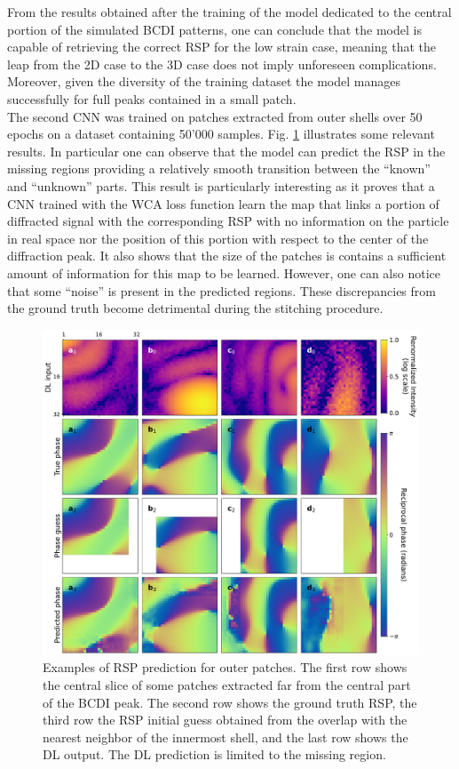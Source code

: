 From the results obtained after the training of the model dedicated to the central portion of the simulated BCDI patterns, 
one can conclude that the model is capable of retrieving the correct RSP for the low strain case, meaning that the leap from 
the 2D case to the 3D case does not imply unforeseen complications. Moreover, given the diversity of the training dataset 
the model manages successfully for full peaks contained in a small patch. \\

The second CNN was trained on patches extracted from outer shells over 50 epochs on a dataset containing 50'000 samples. 
Fig. \ref{fig:outerpatch_obj_lowstrain} illustrates some relevant results. In particular one can observe that the model 
can predict the RSP in the missing regions providing a relatively smooth transition between the ``known'' and ``unknown''
parts. This result is particularly interesting as it proves that a CNN trained with the WCA loss function 
learn the map that links a portion of diffracted signal with the corresponding RSP with no information on the particle in
real space nor the position of this portion with respect to the center of the diffraction peak. It also shows that the 
size of the patches is contains a sufficient amount of information for this map to be learned. 
However, one can also notice that some ``noise'' is present in the predicted regions. These discrepancies from the ground 
truth become detrimental during the stitching procedure. 

\begin{figure}[H]
    \centering
    \includegraphics[width=\textwidth]{figures/Phasing/outer_patches_low_strain_RSP.pdf}
    \caption{Examples of RSP prediction for outer patches. The first row shows the central slice of some patches extracted 
    far from the central part of the BCDI peak. The second row shows the ground truth RSP, the third row the RSP initial guess 
    obtained from the overlap with the nearest neighbor of the innermost shell, and the last row shows the 
    DL output. The DL prediction is limited to the missing region. }

    \label{fig:outerpatch_obj_lowstrain}
\end{figure}

